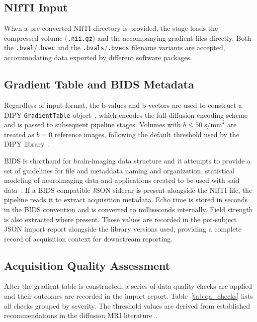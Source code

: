 \subsection{NIfTI Input}
\label{subsec:methods_nifti}

When a pre-converted NIfTI directory is provided, the stage loads the compressed volume (\texttt{.nii.gz}) and the accompanying gradient files directly. Both the \texttt{.bval}/\texttt{.bvec} and the \texttt{.bvals}/\texttt{.bvecs} filename variants are accepted, accommodating data exported by different software packages.

\subsection{Gradient Table and BIDS Metadata}
\label{subsec:methods_gradienttable}

Regardless of input format, the b-values and b-vectors are used to construct a DIPY \texttt{GradientTable} object~\cite{garyfallidis_dipy_2014}, which encodes the full diffusion-encoding scheme and is passed to subsequent pipeline stages. Volumes with $b \leq 50\;\text{s/mm}^2$ are treated as $b = 0$ reference images, following the default threshold used by the DIPY library~\cite{garyfallidis_dipy_2014}.

BIDS is shorthand for brain-imaging data structure and it attempts to provide a set of guidelines for file and metaddata naming and organization, statistical modeling of neuroimaging data and applications created to be used with said data~\cite{gorgolewski2016brain, karakuzu2022qmri}. If a BIDS-compatible JSON sidecar is present alongside the NIfTI file, the pipeline reads it to extract acquisition metadata. Echo time is stored in seconds in the BIDS convention and is converted to milliseconds internally. Field strength is also extracted where present. These values are recorded in the per-subject JSON import report alongside the library versions used, providing a complete record of acquisition context for downstream reporting.

\subsection{Acquisition Quality Assessment}
\label{subsec:methods_qualityassessment}

After the gradient table is constructed, a series of data-quality checks are applied and their outcomes are recorded in the import report. Table~\ref{tab:qa_checks} lists all checks grouped by severity. The threshold values are derived from established recommendations in the diffusion MRI literature~\cite{jones2013white, tournier2011diffusion}.

